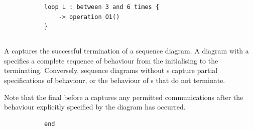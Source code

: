 \begin{figure}[h!]
\begin{subfigure}[t]{\egtextwidth}
\begin{lstlisting}[style=Example]
loop L : between 3 and 6 times {
    -> operation O1()
}
\end{lstlisting}
\end{subfigure}
\hfill
\begin{subfigure}[t]{\eggraphicalwidth}
  \gsecaption
  \centering
\end{subfigure}
\end{figure}

\subsection{\mfinalaction}

A \mfinalaction{} captures the successful termination of a sequence diagram.
A diagram with a \mfinalaction{} specifies a complete sequence of behaviour
from the \mtarget{} initialising to the \mtarget{} terminating.  Conversely,
sequence diagrams without \mfinalaction s capture partial specifications of
behaviour, or the behaviour of \mtarget s that do not terminate.

Note that the final \msequencegap{} before a \mfinalaction{} captures
any permitted communications after the behaviour explicitly specified by the
diagram has occurred.

\begin{figure}[h]

\begin{subfigure}[t]{\egtextwidth}
\begin{lstlisting}[style=Example]
end
\end{lstlisting}
\end{subfigure}
\hfill
\begin{subfigure}[t]{\eggraphicalwidth}
\gsecaption
\centering
{}
\end{subfigure}

\end{figure}

